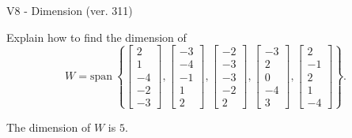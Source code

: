 \begin{exercise}
  \begin{exerciseTitle}V8 - Dimension (ver. 311)\end{exerciseTitle}
  \begin{exerciseStatement}
    Explain how to find the dimension of 
\[W=\mathrm{span}\ \left\{\left[\begin{array}{r}
2 \\
1 \\
-4 \\
-2 \\
-3
\end{array}\right] , \left[\begin{array}{r}
-3 \\
-4 \\
-1 \\
1 \\
2
\end{array}\right] , \left[\begin{array}{r}
-2 \\
-3 \\
-3 \\
-2 \\
2
\end{array}\right] , \left[\begin{array}{r}
-3 \\
2 \\
0 \\
-4 \\
3
\end{array}\right] , \left[\begin{array}{r}
2 \\
-1 \\
2 \\
1 \\
-4
\end{array}\right]\right\}.\]



  \end{exerciseStatement}
  \begin{exerciseAnswer}
   The dimension of \(W\) is  \(5\).
  


  \end{exerciseAnswer}
\end{exercise}